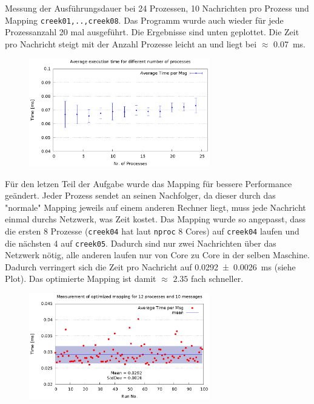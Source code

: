 \documentclass[a4paper,11pt]{scrartcl}
\begin{document}
Messung der Ausführungsdauer bei 24 Prozessen, 10 Nachrichten pro Prozess und Mapping \verb+creek01,..,creek08+. Das Programm wurde auch wieder für jede Prozessanzahl 20 mal ausgeführt. Die Ergebnisse sind unten geplottet. Die Zeit pro Nachricht steigt mit der Anzahl Prozesse leicht an und liegt bei $\approx$ \SI{0.07}{\milli\second}.\\


\begin{figure}[!ht]
    \centering
    \includegraphics[width=0.7\textwidth,keepaspectratio]{2_1/data/time.eps}
\end{figure}


Für den letzen Teil der Aufgabe wurde das Mapping für bessere Performance geändert. Jeder Prozess sendet an seinen Nachfolger, da dieser durch das "normale" Mapping jeweils auf einem anderen Rechner liegt, muss jede Nachricht einmal durchs Netzwerk, was Zeit kostet. 
Das Mapping wurde so angepasst, dass die ersten 8 Prozesse (\verb+creek04+ hat laut \verb+nproc+ 8 Cores) auf \verb+creek04+ laufen und die nächsten 4 auf \verb+creek05+. Dadurch sind nur zwei Nachrichten über das Netzwerk nötig, alle anderen laufen nur von Core zu Core in der selben Maschine. \\

Dadurch verringert sich die Zeit pro Nachricht auf \SI[multi-part-units=single]{0.0292(26)}{\milli\second} (siehe Plot). Das optimierte Mapping ist damit $\approx$ $2.35$ fach schneller.

\begin{figure}[!ht]
    \centering
    \includegraphics[width=0.7\textwidth,keepaspectratio]{2_1/data/opt.eps}
\end{figure}
\end{document}
